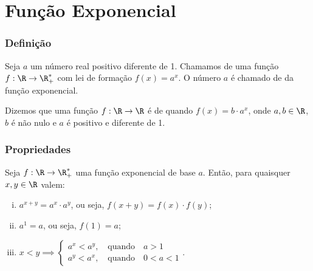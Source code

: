 \documentclass[brazil, notheorems, 10pt]{beamer}
\begin{document}
\section{Função Exponencial}
\begin{frame} \frametitle{Definição}
\begin{definicao}
Seja $a$ um número real positivo diferente de 1. Chamamos de
 uma função $f: \R \to \R_+^\ast$ com lei de
formação $f(x) =
 a^x$. O número $a$ é chamado de  da função exponencial.
\end{definicao}\pause



\begin{definicao}
Dizemos que uma função $f: \R \to \R$ é de 
quando $f(x) =b\cdot a^x$, onde $a,b \in\R$, $b$ é não nulo e $a$ é
positivo e diferente de 1.
\end{definicao}





\end{frame}


\begin{frame}
\frametitle{Propriedades} %

\begin{proposicao}
Seja $f: \R \to \R_+^\ast$ uma função exponencial de base $a$.
Então, para quaisquer $x, y \in \R$ valem:
\begin{enumerate}[(i)]
	\item  $a^{x+y} = a^x\cdot a^y$, ou seja, $f(x+y) = f(x)\cdot f(y)$;
	\item $a^1 = a$, ou seja, $f(1) = a$;
	\item $x<y \implies \begin{cases} a^x < a^y, \ \ \ \text{ quando } \ \ \ a>1 \\
																		a^y < a^x, \ \ \ \text{ quando } \ \ \ 0<a<1
											 \end{cases}.$
\end{enumerate}
\end{proposicao}




\end{frame}

\end{document}

